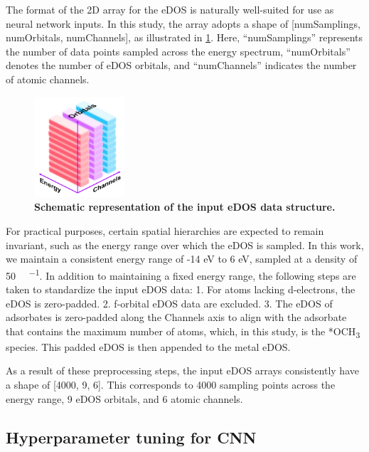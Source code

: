 The format of the 2D array for the eDOS is naturally well-suited for use as neural network inputs.
In this study, the array adopts a shape of [numSamplings, numOrbitals, numChannels], as illustrated in \cref{supp_fig20:input_dos}.
Here, ``numSamplings'' represents the number of data points sampled across the energy spectrum,
``numOrbitals'' denotes the number of eDOS orbitals,
and ``numChannels'' indicates the number of atomic channels.

\begin{figure}[htbp]
  \centering
  \includegraphics[width=0.3\textwidth]{supp_fig20_input_dos.png}
  \caption{\textbf{Schematic representation of the input eDOS data structure.}}
  \label{supp_fig20:input_dos}
\end{figure}

For practical purposes, certain spatial hierarchies are expected to remain invariant,
such as the energy range over which the eDOS is sampled.
In this work, we maintain a consistent energy range of -14 eV to 6 eV,
sampled at a density of 50 \si{ \cdot {}^{-1}}.
In addition to maintaining a fixed energy range,
the following steps are taken to standardize the input eDOS data:
  1.	For atoms lacking d-electrons, the eDOS is zero-padded.
  2.	f-orbital eDOS data are excluded.
  3.	The eDOS of adsorbates is zero-padded along the Channels axis to align with the adsorbate that contains the maximum number of atoms, which, in this study, is the *OCH\textsubscript{3} species. This padded eDOS is then appended to the metal eDOS.

As a result of these preprocessing steps, the input eDOS arrays consistently have a shape of [4000, 9, 6].
This corresponds to 4000 sampling points across the energy range, 9 eDOS orbitals, and 6 atomic channels.

\subsection{Hyperparameter tuning for CNN}
\label{supp_sec3.4_hyperparam}

